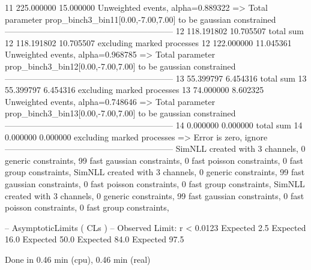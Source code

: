 11         225.000000      15.000000       Unweighted events, alpha=0.889322
  => Total parameter prop_binch3_bin11[0.00,-7.00,7.00] to be gaussian constrained
------------------------------------------------------------
12         118.191802      10.705507       total sum                     
12         118.191802      10.705507       excluding marked processes    
12         122.000000      11.045361       Unweighted events, alpha=0.968785
  => Total parameter prop_binch3_bin12[0.00,-7.00,7.00] to be gaussian constrained
------------------------------------------------------------
13         55.399797       6.454316        total sum                     
13         55.399797       6.454316        excluding marked processes    
13         74.000000       8.602325        Unweighted events, alpha=0.748646
  => Total parameter prop_binch3_bin13[0.00,-7.00,7.00] to be gaussian constrained
------------------------------------------------------------
14         0.000000        0.000000        total sum                     
14         0.000000        0.000000        excluding marked processes    
  => Error is zero, ignore      
------------------------------------------------------------
SimNLL created with 3 channels, 0 generic constraints, 99 fast gaussian constraints, 0 fast poisson constraints, 0 fast group constraints, 
SimNLL created with 3 channels, 0 generic constraints, 99 fast gaussian constraints, 0 fast poisson constraints, 0 fast group constraints, 
SimNLL created with 3 channels, 0 generic constraints, 99 fast gaussian constraints, 0 fast poisson constraints, 0 fast group constraints, 

 -- AsymptoticLimits ( CLs ) --
Observed Limit: r < 0.0123
Expected  2.5%
Expected 16.0%
Expected 50.0%
Expected 84.0%
Expected 97.5%

Done in 0.46 min (cpu), 0.46 min (real)
